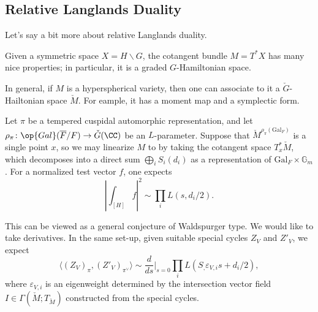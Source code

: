 \documentclass{article}
\begin{document}
\subsection{Relative Langlands Duality}
Let's say a bit more about relative Langlands duality.
\begin{example}
	Given a symmetric space $X=H\backslash G$, the cotangent bundle $M=T^*X$ has many nice properties; in particular, it is a graded $G$-Hamiltonian space.
\end{example}
In general, if $M$ is a hyperspherical variety, then one can associate to it a $\check G$-Hailtonian space $\check M$. For eample, it has a moment map and a symplectic form.
\begin{conj}
	Let $\pi$ be a tempered cuspidal automorphic representation, and let $\rho_\pi\colon\op{Gal}(\overline F/F)\to\check G(\CC)$ be an $L$-parameter. Suppose that $\check M^{\rho_\pi(\mathrm{Gal}_F)}$ is a single point $x$, so we may linearize $M$ to by taking the cotangent space $T_x^*\check M$, which decomposes into a direct sum $\bigoplus_iS_i(d_i)$ as a representation of $\mathrm{Gal}_F\times\mathbb G_m$. For a normalized test vector $f$, one expects
	\[\left|\int_{[H]}f\right|^2\sim\prod_iL(s,d_i/2).\]
\end{conj}
This can be viewed as a general conjecture of Waldspurger type. We would like to take derivatives. In the same set-up, given suitable special cycles $Z_V$ and $Z'_V$, we expect
\[\langle(Z_V)_\pi,(Z'_V)_{\pi^\lor}\rangle\sim\frac d{ds}\bigg|_{s=0}\prod_iL(S_,\varepsilon_{V,i}s+d_i/2),\]
where $\varepsilon_{V,i}$ is an eigenweight determined by the intersection vector field $I\in\Gamma(\check M;T_{\check M})$ constructed from the special cycles.
\end{document}
